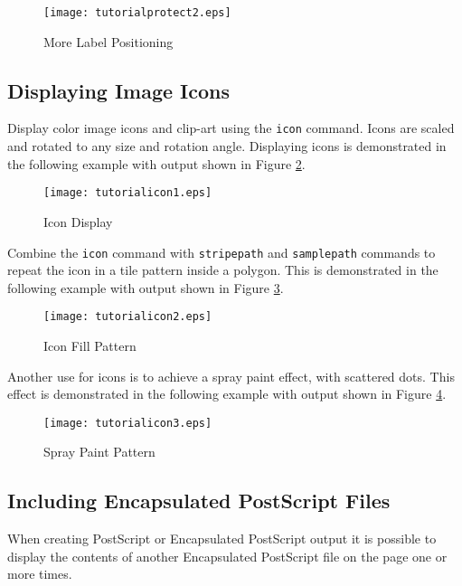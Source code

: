 

\begin{figure}[htb]
\texttt{[image: tutorialprotect2.eps]}
\caption{More Label Positioning}
\label{tutorialprotect2}
\end{figure}

\subsection{Displaying Image Icons}
\label{icons}

Display color image icons and clip-art using the \texttt{icon} command.
Icons are scaled and rotated to any size and rotation angle.
Displaying icons is demonstrated in the following example
with output shown in Figure \ref{tutorialicon1}.



\begin{figure}[htb]
\texttt{[image: tutorialicon1.eps]}
\caption{Icon Display}
\label{tutorialicon1}
\end{figure}

Combine the \texttt{icon} command with
\texttt{stripepath} and
\texttt{samplepath} commands to
repeat the icon in a tile pattern inside a polygon.
This is demonstrated in the following example
with output shown in Figure \ref{tutorialicon2}.



\begin{figure}[htb]
\texttt{[image: tutorialicon2.eps]}
\caption{Icon Fill Pattern}
\label{tutorialicon2}
\end{figure}

Another use for icons is to achieve a spray paint effect,
with scattered dots.
This effect is demonstrated in the following example
with output shown in Figure \ref{tutorialicon3}.



\begin{figure}[htb]
\texttt{[image: tutorialicon3.eps]}
\caption{Spray Paint Pattern}
\label{tutorialicon3}
\end{figure}

\subsection{Including Encapsulated PostScript Files}

When creating PostScript or Encapsulated PostScript output it 
is possible to display the contents of another Encapsulated PostScript
file on the page one or more times.

